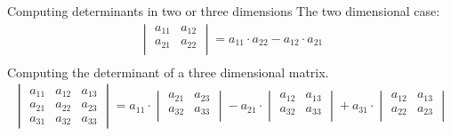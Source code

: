 \documentclass[notes]{beamer}
\begin{document}
    \begin{frame}{Computing determinants in two or three dimensions}
      The two dimensional case:
      \begin{align}
        \begin{vmatrix}
          a_{11} & a_{12} \\
          a_{21} & a_{22} \\
        \end{vmatrix}
        = a_{11} \cdot a_{22} - a_{12} \cdot a_{21} \\
      \end{align}
      Computing the determinant of a three dimensional matrix.
      \begin{align}
        \begin{vmatrix}
          a_{11} & a_{12} & a_{13}  \\
          a_{21} & a_{22} & a_{23}  \\
          a_{31} & a_{32} & a_{33}
        \end{vmatrix}
        = a_{11} \cdot
         \begin{vmatrix}
          a_{21} & a_{23}   \\
          a_{32} & a_{33}   \\
         \end{vmatrix}  
         -
         a_{21} \cdot
         \begin{vmatrix}
          a_{12} & a_{13}   \\
          a_{32} & a_{33}   \\
         \end{vmatrix}  
        +
         a_{31} \cdot
         \begin{vmatrix}
          a_{12} & a_{13}   \\
          a_{22} & a_{23}   \\
         \end{vmatrix}  
      \end{align}

    \end{frame}
\end{document}
